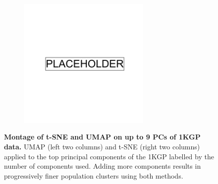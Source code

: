 \begin{figure}[ht]
    \centering
    \begin{subfigure}{\textwidth}
    \includegraphics[width=0.7\textwidth]{placeholder.png}
    \end{subfigure}
    \caption[Montage of t-SNE and UMAP on up to 9 PCs of 1KGP data]{\textbf{Montage of t-SNE and UMAP on up to 9 PCs of 1KGP data.} UMAP (left two columns) and t-SNE (right two columns) applied to the top principal components of the 1KGP labelled by the number of components used. Adding more components results in progressively finer population clusters using both methods.}
    \label{fig:supp_megamontage_pc2_9}  
\end{figure}

\newpage

